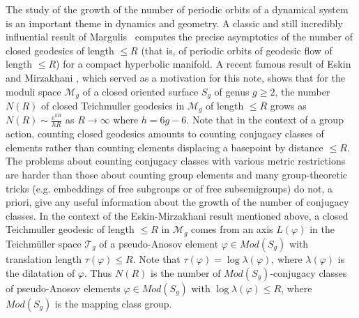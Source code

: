 \documentclass[11pt,letterpaper]{amsart}
\theoremstyle{definition}
\theoremstyle{remark}
\renewcommand{\phi}{\varphi}
\begin{document}
The study of the growth of the number of periodic orbits of a dynamical system is an important theme in dynamics and geometry. A classic and still incredibly influential result of Margulis~\cite{M} computes the precise asymptotics of the number of closed geodesics of length $\le R$ (that is, of periodic orbits of geodesic flow of length $\le R$) for a compact hyperbolic manifold.  A recent famous result of Eskin and Mirzakhani \cite{EM}, which served as a motivation for this note, shows that for the moduli space $\mathcal M_g$ of a closed oriented surface $S_g$ of genus $g\ge 2$, the number $N(R)$ of closed Teichmuller geodesics in $\mathcal M_g$ of length $\le R$ grows as $N(R)\sim \frac{e^{hR}}{hR}$ as $R\to\infty$ where $h=6g-6$.  Note that in the context of a group action, counting closed geodesics amounts to counting conjugacy classes of elements rather than counting elements displacing a basepoint by distance $\le R$. The problems about counting conjugacy classes with various metric restrictions are harder than those about counting group elements and many group-theoretic tricks (e.g. embeddings of free subgroups or of free subsemigroups) do not, a priori, give any useful information about the growth of the number of conjugacy classes.   In the context of the Eskin-Mirzakhani result mentioned above, a closed Teichmuller geodesic of length $\le R$ in $\mathcal M_g$ comes from an axis $L(\phi)$ in the Teichm\"uller space $\mathcal T_g$ of a pseudo-Anosov element $\phi\in Mod(S_g)$ with translation length $\tau(\phi)\le R$. Note that $\tau(\phi)=\log \lambda(\phi)$, where $\lambda(\phi)$ is the dilatation of $\phi$. Thus $N(R)$ is the number of $Mod(S_g)$-conjugacy classes of pseudo-Anosov elements $\phi\in Mod(S_g)$ with $\log \lambda(\phi)\le R$, where $Mod(S_g)$ is the mapping class group.
\end{document}

